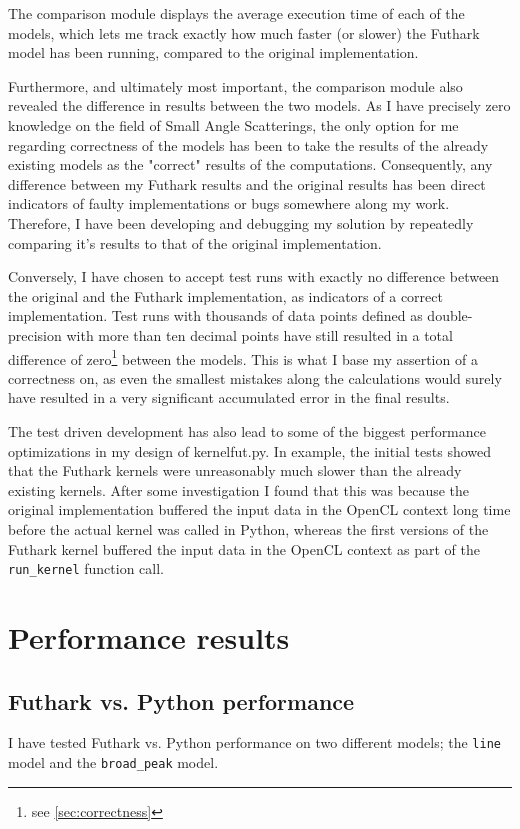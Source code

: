 \documentclass[11pt]{article}
\begin{document}
The comparison module displays the average execution time of each of the models,
which lets me track exactly how much faster (or slower) the Futhark model has
been running, compared to the original implementation.

Furthermore, and ultimately most important, the comparison module also
revealed the difference in results between the two models. 
As I have precisely zero knowledge on the field of Small Angle Scatterings, 
the only option for me regarding correctness of the models has been to take
the results of the already existing models as the "correct" results of the
computations. Consequently, any difference between my Futhark results and the
original results has been direct indicators of faulty implementations or bugs
somewhere along my work.
Therefore, I have been developing and debugging my solution by repeatedly
comparing it's results to that of the original implementation.

Conversely, I have chosen to accept test runs with exactly no difference
between the original and the Futhark implementation, as indicators of a
correct implementation. 
Test runs with thousands of data points defined as double-precision
with more than ten decimal points have still resulted in a total difference of
zero\footnote{see \ref{sec:correctness}} between the models.
This is what I base my assertion of a correctness on, as even the smallest 
mistakes along the calculations would surely have resulted in a very significant
accumulated error in the final results.

The test driven development has also lead to some of the biggest performance
optimizations in my design of kernelfut.py.
In example, the initial tests showed that the Futhark kernels were unreasonably
much slower than the already existing kernels. After some investigation I found
that this was because the original implementation buffered the input data in the
OpenCL context long time before the actual kernel was called in Python, whereas
the first versions of the Futhark kernel buffered the input data in the OpenCL
context as part of the \texttt{run\_kernel} function call.

\section{Performance results}
\label{performance}
\subsection{Futhark vs. Python performance}
I have tested Futhark vs. Python performance on two different models; 
the \texttt{line} model and the \texttt{broad\_peak} model.
\end{document}
